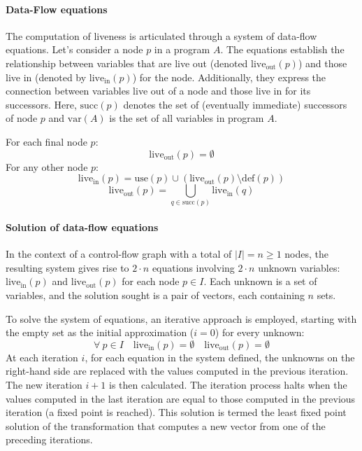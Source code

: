 \paragraph*{Data-Flow equations}
The computation of liveness is articulated through a system of data-flow equations. 
Let's consider a node $p$ in a program $A$.
The equations establish the relationship between variables that are live out (denoted $\text{live}_\text{out}\left( p \right)$) and those live in (denoted by $\text{live}_\text{in}\left( p \right)$) for the node. 
Additionally, they express the connection between variables live out of a node and those live in for its successors.
Here, $\text{succ}\left( p \right)$ denotes the set of (eventually immediate) successors of node $p$ and $\text{var}(A)$ is the set of all variables in program $A$.
\begin{definition}
      For each final node $p$:
      \[ \text{live}_\text{out}\left( p \right) = \emptyset \]
      For any other node $p$:
      \[ \text{live}_\text{in}\left( p \right) = \text{use}\left( p \right) \cup \left( \text{live}_\text{out} \left( p \right) \setminus \text{def}\left( p \right) \right) \]
      \[ \text{live}_\text{out}\left( p \right) = \bigcup_{q \in \text{succ}\left( p \right)} \text{live}_\text{in}\left( q \right) \]
\end{definition}

\paragraph*{Solution of data-flow equations}
In the context of a control-flow graph with a total of $\mid I\mid  = n \geq 1$ nodes, the resulting system gives rise to $2 \cdot n$ equations involving $2 \cdot n$ unknown variables: $\text{live}_\text{in}\left( p \right)$ and $\text{live}_\text{out}\left( p \right)$ for each node $p \in I$.
Each unknown is a set of variables, and the solution sought is a pair of vectors, each containing $n$ sets.

To solve the system of equations, an iterative approach is employed, starting with the empty set as the initial approximation ($i=0$) for every unknown:
\[ \forall \: p \in I \quad \text{live}_\text{in}\left( p \right) = \emptyset \quad \text{live}_\text{out} \left( p \right) = \emptyset \]
At each iteration $i$, for each equation in the system defined, the unknowns on the right-hand side are replaced with the values computed in the previous iteration.
The new iteration $i + 1$ is then calculated.
The iteration process halts when the values computed in the last iteration are equal to those computed in the previous iteration (a fixed point is reached). 
This solution is termed the least fixed point solution of the transformation that computes a new vector from one of the preceding iterations.

